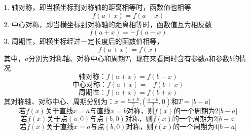 1. 轴对称，即当横坐标到对称轴的距离相等时，函数值也相等
\begin{equation}
f\left( {a + x} \right) = f\left( {a - x} \right)
\end{equation}
2. 中心对称，即当横坐标到对称轴的距离相等时，函数值互为相反数
\begin{equation}
f\left( {a + x} \right) =  - f\left( {a - x} \right)
\end{equation}
3. 周期性，即横坐标经过一定长度后的函数值相等，
\begin{equation}
f\left( {a + x} \right) = f\left( x \right)
\end{equation}
其中，$a$分别为对称轴、对称中心和周期$T$，现在来看同时含有参数$a$和参数$b$的情况
\begin{equation}
轴对称：f\left( {a + x} \right) = f\left( {b - x} \right)
\end{equation}
\begin{equation}
中心对称：f\left( {a + x} \right) =  - f\left( {b + x} \right)
\end{equation}
\begin{equation}
周期性：f\left( {a + x} \right) = f\left( {b + x} \right)
\end{equation}
其对称轴、对称中心、周期分别为：$x = \frac{{a + b}}{2}$,$\left( {\frac{{a + b}}{2},0} \right)$和$T = \left| {b - a} \right|$
\begin{equation}
若f(x)关于直线x=a与直线x=b对称，则f(x)的一个周期为2\left| {b - a} \right|
\end{equation}
\begin{equation}
若f(x)关于点(a,0)与点(b,0)对称，则f(x)的一个周期为2\left| {b - a} \right|
\end{equation}
\begin{equation}
若f(x)关于直线x=a与点(b,0)对称，则f(x)的一个周期为4\left| {b - a} \right|
\end{equation}